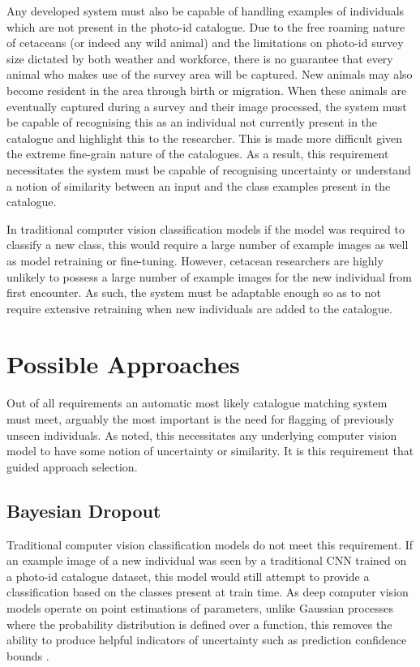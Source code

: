 Any developed system must also be capable of handling examples of individuals which are not present in the photo-id catalogue. Due to the free roaming nature of cetaceans (or indeed any wild animal) and the limitations on photo-id survey size dictated by both weather and workforce, there is no guarantee that every animal who makes use of the survey area will be captured. New animals may also become resident in the area through birth or migration. When these animals are eventually captured during a survey and their image processed, the system must be capable of recognising this as an individual not currently present in the catalogue and highlight this to the researcher. This is made more difficult given the extreme fine-grain nature of the catalogues. As a result, this requirement necessitates the system must be capable of recognising uncertainty or understand a notion of similarity between an input and the class examples present in the catalogue. 

In traditional computer vision classification models if the model was required to classify a new class, this would require a large number of example images as well as model retraining or fine-tuning. However, cetacean researchers are highly unlikely to possess a large number of example images for the new individual from first encounter. As such, the system must be adaptable enough so as to not require extensive retraining when new individuals are added to the catalogue.

\section{Possible Approaches}\label{ch:ID,sec:deciding}

Out of all requirements an automatic most likely catalogue matching system must meet, arguably the most important is the need for flagging of previously unseen individuals. As noted, this necessitates any underlying computer vision model to have some notion of uncertainty or similarity. It is this requirement that guided approach selection. 

\subsection{Bayesian Dropout}\label{ch:ID,sec:deciding,sub:bayesianDropout}

Traditional computer vision classification models do not meet this requirement. If an example image of a new individual was seen by a traditional CNN trained on a photo-id catalogue dataset, this model would still attempt to provide a classification based on the classes present at train time.  As deep computer vision models operate on point estimations of parameters, unlike Gaussian processes where the probability distribution is defined over a function, this removes the ability to produce helpful indicators of uncertainty such as prediction confidence bounds \cite{gal_uncertainty_2016}. 

